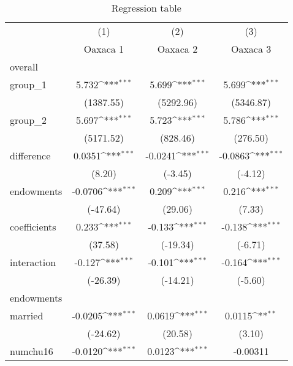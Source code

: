 \begin{table}[htbp]\centering
\def\sym#1{\ifmmode^{#1}\else\(^{#1}\)\fi}
\caption{Regression table\label{tab1}}
\begin{tabular}{l*{3}{c}}
\hline\hline
            &\multicolumn{1}{c}{(1)}&\multicolumn{1}{c}{(2)}&\multicolumn{1}{c}{(3)}\\
            &\multicolumn{1}{c}{Oaxaca 1}&\multicolumn{1}{c}{Oaxaca 2}&\multicolumn{1}{c}{Oaxaca 3}\\
\hline
overall     &                     &                     &                     \\
group\_1     &       5.732\sym{***}&       5.699\sym{***}&       5.699\sym{***}\\
            &   (1387.55)         &   (5292.96)         &   (5346.87)         \\
[1em]
group\_2     &       5.697\sym{***}&       5.723\sym{***}&       5.786\sym{***}\\
            &   (5171.52)         &    (828.46)         &    (276.50)         \\
[1em]
difference  &      0.0351\sym{***}&     -0.0241\sym{***}&     -0.0863\sym{***}\\
            &      (8.20)         &     (-3.45)         &     (-4.12)         \\
[1em]
endowments  &     -0.0706\sym{***}&       0.209\sym{***}&       0.216\sym{***}\\
            &    (-47.64)         &     (29.06)         &      (7.33)         \\
[1em]
coefficients&       0.233\sym{***}&      -0.133\sym{***}&      -0.138\sym{***}\\
            &     (37.58)         &    (-19.34)         &     (-6.71)         \\
[1em]
interaction &      -0.127\sym{***}&      -0.101\sym{***}&      -0.164\sym{***}\\
            &    (-26.39)         &    (-14.21)         &     (-5.60)         \\
\hline
endowments  &                     &                     &                     \\
married     &     -0.0205\sym{***}&      0.0619\sym{***}&      0.0115\sym{**} \\
            &    (-24.62)         &     (20.58)         &      (3.10)         \\
[1em]
numchu16    &     -0.0120\sym{***}&      0.0123\sym{***}&    -0.00311         \\

\end{tabular}
\end{table}
